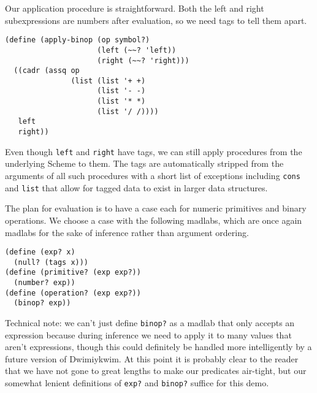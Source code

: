 \documentclass[11pt]{article}
\begin{document}
Our application procedure is straightforward.
Both the left and right subexpressions are numbers after evaluation,
so we need tags to tell them apart.
\begin{Verbatim}
(define (apply-binop (op symbol?)
                     (left (~~? 'left))
                     (right (~~? 'right)))
  ((cadr (assq op
               (list (list '+ +)
                     (list '- -)
                     (list '* *)
                     (list '/ /))))
   left
   right))
\end{Verbatim}
Even though \texttt{left} and \texttt{right} have tags,
we can still apply procedures from the underlying Scheme to them.
The tags are automatically stripped from the arguments of all such procedures
with a short list of exceptions including \texttt{cons} and \texttt{list}
that allow for tagged data to exist in larger data structures.

The plan for evaluation is to have a case each
for numeric primitives and binary operations.
We choose a case with the following madlabs,
which are once again madlabs for the sake of inference
rather than argument ordering.
\begin{Verbatim}
(define (exp? x)
  (null? (tags x)))
(define (primitive? (exp exp?))
  (number? exp))
(define (operation? (exp exp?))
  (binop? exp))
\end{Verbatim}
Technical note: we can't just define \texttt{binop?} as a madlab
that only accepts an expression
because during inference we need to apply it
to many values that aren't expressions,
though this could definitely be handled more intelligently
by a future version of Dwimiykwim.
At this point it is probably clear to the reader that
we have not gone to great lengths to make our predicates air-tight,
but our somewhat lenient definitions of \texttt{exp?} and \texttt{binop?}
suffice for this demo.
\end{document}
